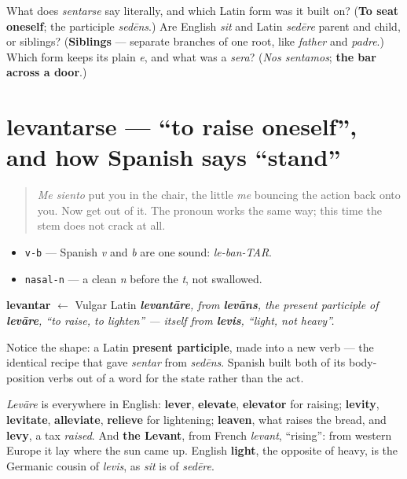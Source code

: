 \begin{tcolorbox}[breakable,colback=teal!4,colframe=teal!35!black,title={Before you move on}]
What does \emph{sentarse} say literally, and which Latin form was it built on? (\textbf{To seat oneself}; the participle \emph{sedēns}.) Are English \emph{sit} and Latin \emph{sedēre} parent and child, or siblings? (\textbf{Siblings} — separate branches of one root, like \emph{father} and \emph{padre}.) Which form keeps its plain \emph{e}, and what was a \emph{sera}? (\emph{Nos sentamos}; \textbf{the bar across a door}.)
\end{tcolorbox}
\section[levantarse]{levantarse — \textquotedblleft{}to raise oneself\textquotedblright{}, and how Spanish says \textquotedblleft{}stand\textquotedblright{}}

\label{lesson:ES-C37-levantarse}



\begin{quote}
\emph{Me siento} put you in the chair, the little \emph{me} bouncing the action back onto you. Now get out of it. The pronoun works the same way; this time the stem does not crack at all.
\end{quote}

\begin{sounds}
\begin{itemize}
\raggedright
  \item \texttt{v-b} — Spanish \emph{v} and \emph{b} are one sound: \emph{le-ban-TAR}.
  \item \texttt{nasal-n} — a clean \emph{n} before the \emph{t}, not swallowed.
\end{itemize}
\end{sounds}

\begin{cousinweb}
\textbf{levantar} $\leftarrow$ Vulgar Latin \emph{\textbf{levantāre}, from \textbf{levāns}, the present participle of \textbf{levāre}, \textquotedblleft{}to raise, to lighten\textquotedblright{} — itself from \textbf{levis}, \textquotedblleft{}light, not heavy\textquotedblright{}.}

Notice the shape: a Latin \textbf{present participle}, made into a new verb — the identical recipe that gave \emph{sentar} from \emph{sedēns}. Spanish built both of its body-position verbs out of a word for the state rather than the act.

\emph{Levāre} is everywhere in English: \textbf{lever}, \textbf{elevate}, \textbf{elevator} for raising; \textbf{levity}, \textbf{levitate}, \textbf{alleviate}, \textbf{relieve} for lightening; \textbf{leaven}, what raises the bread, and \textbf{levy}, a tax \emph{raised}. And \textbf{the Levant}, from French \emph{levant}, \textquotedblleft{}rising\textquotedblright{}: from western Europe it lay where the sun came up. English \textbf{light}, the opposite of heavy, is the Germanic cousin of \emph{levis}, as \emph{sit} is of \emph{sedēre}.
\end{cousinweb}

